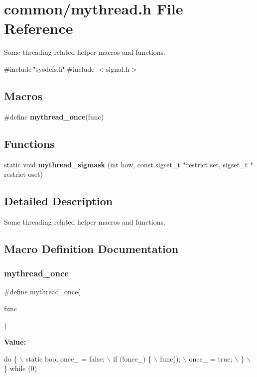 \section{common/mythread.h File Reference}
\label{mythread_8h}


Some threading related helper macros and functions.  


{\ttfamily \#include \char`\"{}sysdefs.\+h\char`\"{}}\newline
{\ttfamily \#include $<$signal.\+h$>$}\newline
\subsection*{Macros}
\begin{DoxyCompactItemize}
\item 
\#define {\bfseries mythread\+\_\+once}(func)
\end{DoxyCompactItemize}
\subsection*{Functions}
\begin{DoxyCompactItemize}
\item 
\mbox{\label{mythread_8h_a0e96186508c34cd67bd3bb762cb56b0c}} 
static void {\bfseries mythread\+\_\+sigmask} (int how, const sigset\+\_\+t $\ast$restrict set, sigset\+\_\+t $\ast$restrict oset)
\end{DoxyCompactItemize}


\subsection{Detailed Description}
Some threading related helper macros and functions. 



\subsection{Macro Definition Documentation}
\mbox{\label{mythread_8h_a261f7be6500d83d7f34ae0bf33b4d4cf}} 
\subsubsection{mythread\+\_\+once}
{\footnotesize\ttfamily \#define mythread\+\_\+once(\begin{DoxyParamCaption}\item[{}]{func }\end{DoxyParamCaption})}

{\bfseries Value\+:}
\begin{DoxyCode}
\textcolor{keywordflow}{do} \{ \(\backslash\)
        static \textcolor{keywordtype}{bool} once\_ = \textcolor{keyword}{false}; \(\backslash\)
        if (!once\_) \{ \(\backslash\)
                func(); \(\backslash\)
                once\_ = \textcolor{keyword}{true}; \(\backslash\)
        \} \(\backslash\)
\} \textcolor{keywordflow}{while} (0)
\end{DoxyCode}
